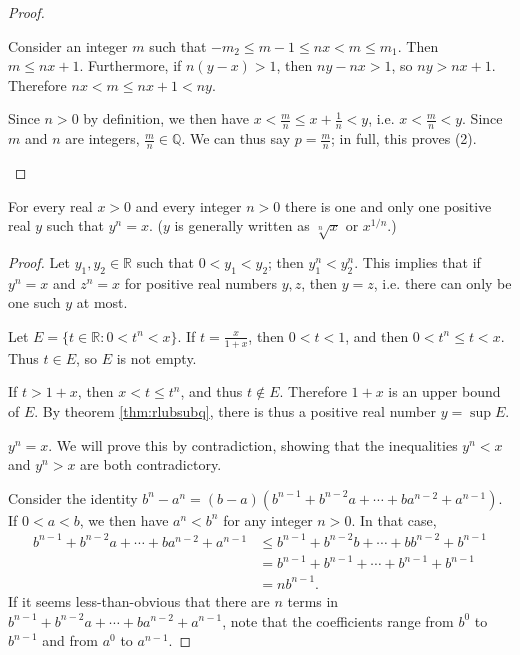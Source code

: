 \documentclass[12pt]{article}
\begin{document}
\begin{thm}
\begin{proof}
\begin{enumerate}
        Consider an integer $m$ such that $-m_2 \leq m - 1 \leq nx < m \leq m_1$.
        Then $m \leq nx + 1$. Furthermore, if $n(y - x) > 1$, then $ny - nx > 1$, so
        $ny > nx + 1$. Therefore $nx < m \leq nx + 1 < ny$.

        Since $n > 0$ by definition, we then have $x < \frac{m}{n} \leq x +
        \frac{1}{n} < y$, i.e. $x < \frac{m}{n} < y$. Since $m$ and $n$ are integers,
        $\frac{m}{n} \in \mathbb{Q}$. We can thus say $p = \frac{m}{n}$; in full,
        this proves (2).
    \end{enumerate}
  \end{proof}
\end{thm}

\begin{thm} \label{thm:uniqrealroots}
  For every real $x > 0$ and every integer $n > 0$ there is one and only one positive
  real $y$ such that $y^n = x$. ($y$ is generally written as $\sqrt[n]{x}$ or
  $x^{1/n}$.)

  \begin{proof}
    Let $y_1,y_2 \in \mathbb{R}$ such that $0 < y_1 < y_2$; then $y_1^n < y_2^n$.
    This implies that if $y^n = x$ and $z^n = x$ for positive real numbers $y,z$,
    then $y = z$, i.e. there can only be one such $y$ at most.

    Let $E = \{t \in \mathbb{R}: 0 < t^n < x\}$. If $t = \frac{x}{1 + x}$, then $0
    < t < 1$, and then $0 < t^n \leq t < x$. Thus $t \in E$, so $E$ is not empty.

    If $t > 1 + x$, then $x < t \leq t^n$, and thus $t \notin E$. Therefore $1 + x$
    is an upper bound of $E$. By theorem \ref{thm:rlubsubq}, there is thus a positive
    real number $y = \sup E$.

    $y^n = x$. We will prove this by contradiction, showing that the inequalities
    $y^n < x$ and $y^n > x$ are both contradictory.

    Consider the identity $b^n - a^n = (b - a)(b^{n - 1} + b^{n - 2}a + \cdots +
    ba^{n - 2} + a^{n - 1})$. If $0 < a < b$, we then have $a^n < b^n$ for any
    integer $n > 0$. In that case,
    \begin{align*}
      b^{n - 1} + b^{n - 2}a + \cdots + ba^{n - 2} + a^{n - 1}
      &\leq b^{n - 1} + b^{n - 2}b + \cdots + bb^{n - 2} + b^{n - 1}\\
      &= b^{n - 1} + b^{n - 1} + \cdots + b^{n - 1} + b^{n - 1}\\
      &= nb^{n - 1}.
    \end{align*}
    If it seems less-than-obvious that there are $n$ terms in $b^{n - 1} + b^{n - 2}a
    + \cdots + ba^{n - 2} + a^{n - 1}$, note that the coefficients range from
    $b^0$ to $b^{n - 1}$ and from $a^0$ to $a^{n - 1}$.


\end{proof}
\end{thm}
\end{document}
